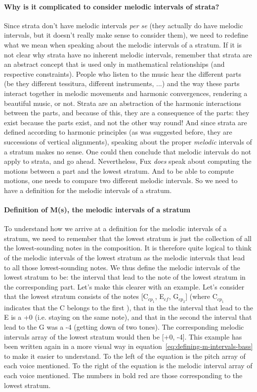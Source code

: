 \paragraph{Why is it complicated to consider melodic intervals of strata?}
Since strata don't have melodic intervals \textit{per se} (they actually do have melodic intervals, but it doesn't really make sense to consider them), we need to redefine what we mean when speaking about the melodic intervals of a stratum. If it is not clear why strata have no inherent melodic intervals, remember that strata are an abstract concept that is used only in mathematical relationships (and respective constraints). People who listen to the music hear the different parts (be they different tessitura, different instruments, ...) and the way these parts interact together in melodic movements and harmonic convergences, rendering a beautiful music, or not. Strata are an abstraction of the harmonic interactions between the parts, and because of this, they are a consequence of the parts: they exist because the parts exist, and not the other way round! And since strata are defined according to harmonic principles (as was suggested before, they are successions of vertical alignments), speaking about the proper \textit{melodic} intervals of a stratum makes no sense. One could then conclude that melodic intervals do not apply to strata, and go ahead. Nevertheless, Fux \textit{does} speak about computing the motions between a part and the lowest stratum. And to be able to compute motions, one needs to compare two different melodic intervals. So we need to have a definition for the melodic intervals of a stratum. 

\paragraph{Definition of M(s), the melodic intervals of a stratum}
To understand how we arrive at a definition for the melodic intervals of a stratum, we need to remember that the lowest stratum is just the collection of all the lowest-sounding notes in the composition. It is therefore quite logical to think of the melodic intervals of the lowest stratum as the melodic intervals that lead to all those lowest-sounding notes. We thus define the melodic intervals of the lowest stratum to be: the interval that lead to the note of the lowest stratum in the corresponding part. Let's make this clearer with an example. Let's consider that the lowest stratum consists of the notes [C$_{cp_1}$, E$_{\mathit{cf}}$, G$_{cp_2}$] (where C$_{cp_1}$ indicates that the C belongs to the first \cp), that in the \cfs the interval that lead to the E is a +0 (i.e. staying on the same note), and that in the second \cps the interval that lead to the G was a -4 (getting down of two tones). The corresponding melodic intervals array of the lowest stratum would then be [+0, -4]. This example has been written again in a more visual way in equation~\ref{eq:defining-m-intervals-bass} to make it easier to understand. To the left of the equation is the pitch array of each voice mentioned. To the right of the equation is the melodic interval array of each voice mentioned. The numbers in bold red are those corresponding to the lowest stratum.


